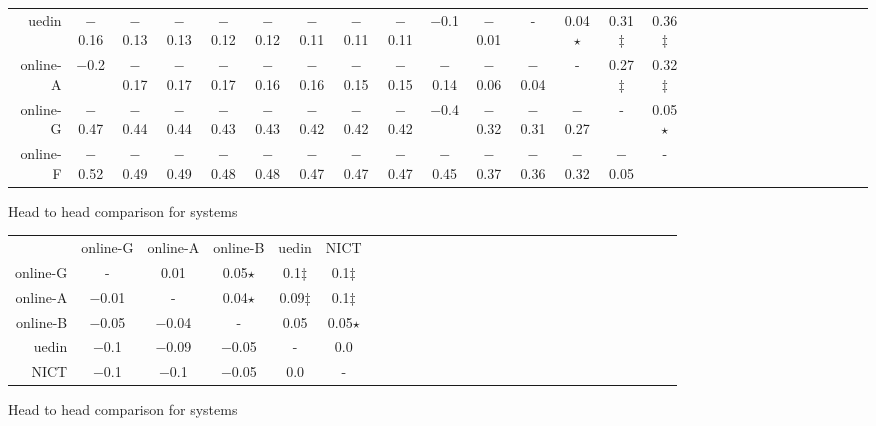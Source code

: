 \begin{tabular}{rccccccccccccccccccccccccccc}
uedin & $-$0.16 & $-$0.13 & $-$0.13 & $-$0.12 & $-$0.12 & $-$0.11 & $-$0.11 & $-$0.11 & $-$0.1 & $-$0.01 & - &    0.04$\star$ &    0.31$\ddagger$ &    0.36$\ddagger$ \\ 
online-A & $-$0.2 & $-$0.17 & $-$0.17 & $-$0.17 & $-$0.16 & $-$0.16 & $-$0.15 & $-$0.15 & $-$0.14 & $-$0.06 & $-$0.04 & - &    0.27$\ddagger$ &    0.32$\ddagger$ \\ 
online-G & $-$0.47 & $-$0.44 & $-$0.44 & $-$0.43 & $-$0.43 & $-$0.42 & $-$0.42 & $-$0.42 & $-$0.4 & $-$0.32 & $-$0.31 & $-$0.27 & - &    0.05$\star$ \\ 
online-F & $-$0.52 & $-$0.49 & $-$0.49 & $-$0.48 & $-$0.48 & $-$0.47 & $-$0.47 & $-$0.47 & $-$0.45 & $-$0.37 & $-$0.36 & $-$0.32 & $-$0.05 & - \\ 


\end{tabular}
\caption{Head to head comparison for \ZHen systems}
\label{pairwise-zhen}


\begin{tabular}{rccccccccccccccccccccccccccc}

 & online-G & online-A & online-B & uedin & NICT \\ 
online-G & - &    0.01 &    0.05$\star$ &    0.1$\ddagger$ &    0.1$\ddagger$ \\ 
online-A & $-$0.01 & - &    0.04$\star$ &    0.09$\ddagger$ &    0.1$\ddagger$ \\ 
online-B & $-$0.05 & $-$0.04 & - &    0.05 &    0.05$\star$ \\ 
uedin & $-$0.1 & $-$0.09 & $-$0.05 & - &    0.0 \\ 
NICT & $-$0.1 & $-$0.1 & $-$0.05 &    0.0 & - \\ 


\end{tabular}
\caption{Head to head comparison for \TRen systems}
\label{pairwise-tren}


